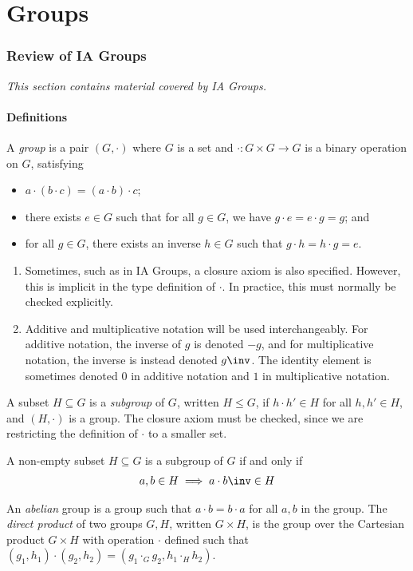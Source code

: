 \part{Groups}

\section{Review of IA Groups}

\textit{This section contains material covered by IA Groups.}

\subsection{Definitions}
A \textit{group} is a pair $(G, \cdot)$ where $G$ is a set and $\cdot : G \times G \to G$ is a binary operation on $G$, satisfying
\begin{itemize}
	\item $a \cdot (b \cdot c) = (a \cdot b) \cdot c$;
	\item there exists $e \in G$ such that for all $g \in G$, we have $g \cdot e = e \cdot g = g$; and
	\item for all $g \in G$, there exists an inverse $h \in G$ such that $g \cdot h = h \cdot g = e$.
\end{itemize}
\begin{remark}
	\begin{enumerate}
		\item Sometimes, such as in IA Groups, a closure axiom is also specified.
		      However, this is implicit in the type definition of $\cdot$.
		      In practice, this must normally be checked explicitly.
		\item Additive and multiplicative notation will be used interchangeably.
		      For additive notation, the inverse of $g$ is denoted $-g$, and for multiplicative notation, the inverse is instead denoted $g\inv$.
		      The identity element is sometimes denoted $0$ in additive notation and $1$ in multiplicative notation.
	\end{enumerate}
\end{remark}
A subset $H \subseteq G$ is a \textit{subgroup} of $G$, written $H \leq G$, if $h \cdot h' \in H$ for all $h, h' \in H$, and $(H, \cdot)$ is a group.
The closure axiom must be checked, since we are restricting the definition of $\cdot$ to a smaller set.
\begin{remark}
	A non-empty subset $H \subseteq G$ is a subgroup of $G$ if and only if
	\begin{align*}
		a, b \in H \implies a \cdot b\inv \in H
	\end{align*}
\end{remark}
An \textit{abelian} group is a group such that $a \cdot b = b \cdot a$ for all $a, b$ in the group.
The \textit{direct product} of two groups $G, H$, written $G \times H$, is the group over the Cartesian product $G \times H$ with operation $\cdot$ defined such that $(g_1, h_1) \cdot (g_2, h_2) = (g_1 \cdot_G g_2, h_1 \cdot_H h_2)$.


